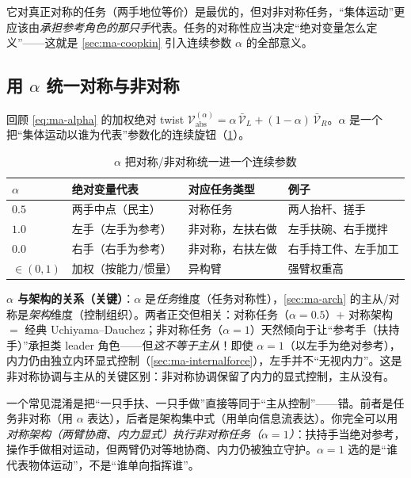\begin{insight}[对称表述的“绝对 $=$ 中点”是关于谁代表集体运动的民主假设]
它对真正对称的任务（两手地位等价）是最优的，但对非对称任务，“集体运动”更应该由\emph{承担参考角色的那只手}代表。任务的对称性应当决定“绝对变量怎么定义”——这就是 \cref{sec:ma-coopkin} 引入连续参数 $\alpha$ 的全部意义。
\end{insight}

\subsection{用 \texorpdfstring{$\alpha$}{alpha} 统一对称与非对称}
\label{sec:ma-alpha-unify}

回顾 \cref{eq:ma-alpha} 的加权绝对 twist $\boldsymbol{\mathcal{V}}_{\text{abs}}^{(\alpha)}=\alpha\,\bar{\boldsymbol{\mathcal{V}}}_L+(1-\alpha)\,\bar{\boldsymbol{\mathcal{V}}}_R$。$\alpha$ 是一个把“集体运动以谁为代表”参数化的连续旋钮（\cref{tab:ma-alpha-table}）。

\begin{table}[H]\centering\small
\caption{$\alpha$ 把对称/非对称统一进一个连续参数}
\label{tab:ma-alpha-table}
\begin{tabular}{llll}
\toprule
$\alpha$ & 绝对变量代表 & 对应任务类型 & 例子 \\
\midrule
$0.5$ & 两手中点（民主） & 对称任务 & 两人抬杆、搓手 \\
$1.0$ & 左手（左手为参考） & 非对称，左扶右做 & 左手扶碗、右手搅拌 \\
$0.0$ & 右手（右手为参考） & 非对称，右扶左做 & 右手持工件、左手加工 \\
$\in(0,1)$ & 加权（按能力/惯量） & 异构臂 & 强臂权重高 \\
\bottomrule
\end{tabular}
\end{table}

\noindent\textbf{$\alpha$ 与架构的关系（关键）}：$\alpha$ 是\emph{任务}维度（任务对称性），\cref{sec:ma-arch} 的主从/对称是\emph{架构}维度（控制组织）。两者正交但相关：对称任务（$\alpha=0.5$）$+$ 对称架构 $=$ 经典 Uchiyama--Dauchez；非对称任务（$\alpha=1$）天然倾向于让“参考手（扶持手）”承担类 leader 角色——但\emph{这不等于主从}！即使 $\alpha=1$（以左手为绝对参考），内力仍由独立内环显式控制（\cref{sec:ma-internalforce}），左手并不“无视内力”。这是非对称协调与主从的关键区别：非对称协调保留了内力的显式控制，主从没有。

\begin{insight}
一个常见混淆是把“一只手扶、一只手做”直接等同于“主从控制”——错。前者是任务非对称（用 $\alpha$ 表达），后者是架构集中式（用单向信息流表达）。你完全可以用\emph{对称架构（两臂协商、内力显式）执行非对称任务（$\alpha=1$）}：扶持手当绝对参考，操作手做相对运动，但两臂仍对等地协商、内力仍被独立守护。$\alpha=1$ 选的是“谁代表物体运动”，不是“谁单向指挥谁”。
\end{insight}

